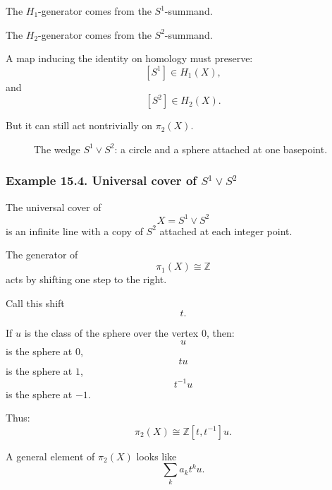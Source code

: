 \documentclass[12pt,a4paper]{article}
\theoremstyle{notespace}
\begin{document}
The \(H_1\)-generator comes from the \(S^1\)-summand.

The \(H_2\)-generator comes from the \(S^2\)-summand.

A map inducing the identity on homology must preserve:
\[
[S^1]\in H_1(X),
\]
and
\[
[S^2]\in H_2(X).
\]

But it can still act nontrivially on \(\pi_2(X)\).

\begin{figure}[htbp]
	\centering
	\caption{The wedge \(S^1\vee S^2\): a circle and a sphere attached at one basepoint.}
\end{figure}

\subsubsection*{Example 15.4. Universal cover of \(S^1\vee S^2\)}

The universal cover of
\[
X=S^1\vee S^2
\]
is an infinite line with a copy of \(S^2\) attached at each integer point.

The generator of
\[
\pi_1(X)\cong \mathbb Z
\]
acts by shifting one step to the right.

Call this shift
\[
t.
\]

If \(u\) is the class of the sphere over the vertex \(0\), then:
\[
u
\]
is the sphere at \(0\),
\[
tu
\]
is the sphere at \(1\),
\[
t^{-1}u
\]
is the sphere at \(-1\).

Thus:
\[
\pi_2(X)\cong \mathbb Z[t,t^{-1}]u.
\]

A general element of \(\pi_2(X)\) looks like
\[
\sum_k a_k t^k u.
\]
\end{document}
